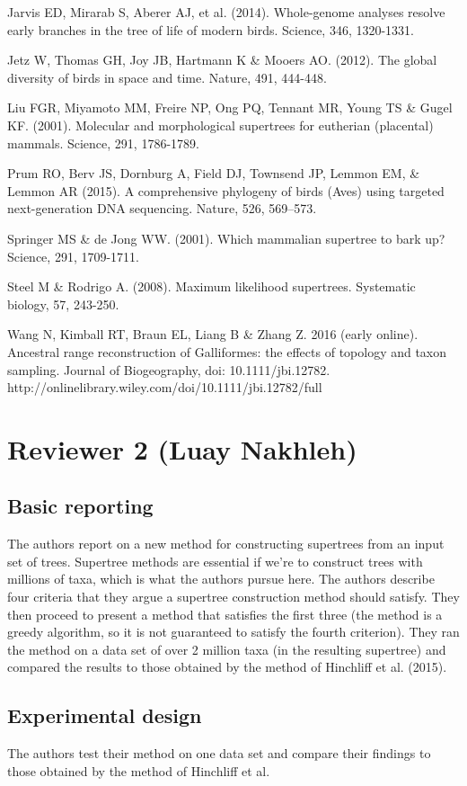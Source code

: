 \documentclass{article}
\begin{document}
Jarvis ED, Mirarab S, Aberer AJ, et al. (2014). Whole-genome analyses resolve early branches in the tree of life of modern birds. Science, 346, 1320-1331.

Jetz W, Thomas GH, Joy JB, Hartmann K \& Mooers AO. (2012). The global diversity of birds in space and time. Nature, 491, 444-448.

Liu FGR, Miyamoto MM, Freire NP, Ong PQ, Tennant MR, Young TS \& Gugel KF. (2001). Molecular and morphological supertrees for eutherian (placental) mammals. Science, 291, 1786-1789.

Prum RO, Berv JS, Dornburg A, Field DJ, Townsend JP, Lemmon EM, \& Lemmon AR (2015). A comprehensive phylogeny of birds (Aves) using targeted next-generation DNA sequencing. Nature, 526, 569–573.

Springer MS \& de Jong WW. (2001). Which mammalian supertree to bark up? Science, 291, 1709-1711.

Steel M \& Rodrigo A. (2008). Maximum likelihood supertrees. Systematic biology, 57, 243-250.

Wang N, Kimball RT, Braun EL, Liang B \& Zhang Z. 2016 (early online). Ancestral range reconstruction of Galliformes: the effects of topology and taxon sampling. Journal of Biogeography, doi: 10.1111/jbi.12782. http://onlinelibrary.wiley.com/doi/10.1111/jbi.12782/full 


\newpage
\section*{Reviewer 2 (Luay Nakhleh)}
\subsection*{Basic reporting}
The authors report on a new method for constructing supertrees from an input set of trees. Supertree methods are essential if we're to construct trees with millions of taxa, which is what the authors pursue here. The authors describe four criteria that they argue a supertree construction method should satisfy. They then proceed to present a method that satisfies the first three (the method is a greedy algorithm, so it is not guaranteed to satisfy the fourth criterion). They ran the method on a data set of over 2 million taxa (in the resulting supertree) and compared the results to those obtained by the method of Hinchliff et al. (2015).
\subsection*{Experimental design}
The authors test their method on one data set and compare their findings to those obtained by the method of Hinchliff et al.
\end{document}
